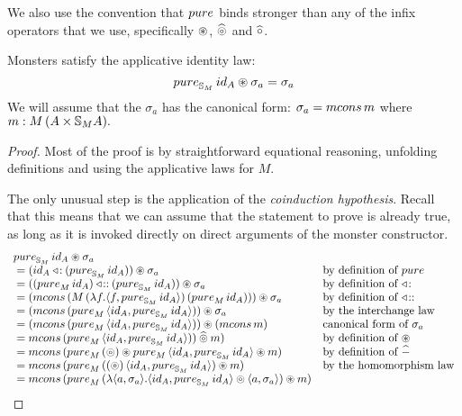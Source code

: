 We also use the convention that $\apure$ binds stronger than any of the infix operators that we use, specifically $\circledast$, $\mathbin{\widehat{\circledcirc}}$ and $\mathbin{\widehat{\circ}}$.

\begin{lemma}
Monsters satisfy the applicative identity law:
$$
\apure_{\stream{M}}\,\id_A \appl \sigma_a = \sigma_a
$$
We will assume that the $\sigma_a$ has the canonical form:
$\sigma_a = \mcons\,m$ where $m:M\,(A\times \mathbb{S}_{M}A).$
\end{lemma}
\begin{proof}
Most of the proof is by straightforward equational reasoning, unfolding definitions and using the applicative laws for $M$.

The only unusual step is the application of the {\em coinduction hypothesis}.
Recall that this means that we can assume that the statement to prove is already true, as long as it is invoked directly on direct arguments of the monster constructor.
$$
\begin{array}{ll}
\apure_{\stream{M}}\,\id_A \appl \sigma_a \\
{}= (\id_A \acons (\apure_{\stream{M}}\,\id_A)) \appl \sigma_a
  & \mbox{by definition of }\apure \\
{}= ((\apure_M\,\id_A) \fcons (\apure_{\stream{M}}\,\id_A)) \appl \sigma_a
  & \mbox{by definition of }\acons \\
{}= (\mcons\,(M\,(\lambda f. \langle f, \apure_{\stream{M}}\,\id_A\rangle)\,(\apure_M\,\id_A))) \appl \sigma_a
  & \mbox{by definition of }\fcons \\
{}= (\mcons\,(\apure_M\,\langle \id_A, \apure_{\stream{M}}\,\id_A \rangle)) \appl \sigma_a
  & \mbox{by the interchange law} \\
{}= (\mcons\,(\apure_M\,\langle \id_A, \apure_{\stream{M}}\,\id_A\rangle)) \appl (\mcons\,m)
  & \mbox{canonical form of }\sigma_a\\
{}= \mcons\,(\apure_M\,\langle \id_A, \apure_{\stream{M}}\,\id_A\rangle)) \alift{\pappl}  m)
  & \mbox{by definition of }\appl \\
{}= \mcons\,(\apure_{M}\,(\pappl) \appl \apure_M\,\langle \id_A, \apure_{\stream{M}}\,\id_A\rangle \appl  m)
  & \mbox{by definition of }\alift{-} \\
{}= \mcons\,(\apure_M\,((\pappl)\,\langle \id_A, \apure_{\stream{M}}\,\id_A\rangle) \appl  m)
  & \mbox{by the homomorphism law}\\
{}= \mcons\,(\apure_M\,(\lambda \langle a,\sigma_a\rangle. \langle \id_A, \apure_{\stream{M}}\,\id_A\rangle \pappl \langle a,\sigma_a\rangle) \appl m)

\end{array}$$
\end{proof}
